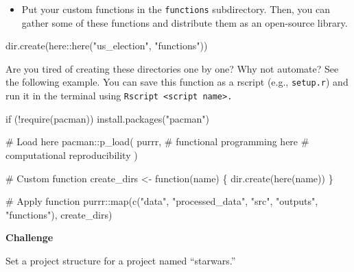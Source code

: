 \documentclass[
  letterpaper,
  DIV=11,
  numbers=noendperiod]{scrreprt}
\newenvironment{Shaded}{\begin{snugshade}}{\end{snugshade}}
\newcommand{\CommentTok}[1]{\textcolor[rgb]{0.37,0.37,0.37}{#1}}
\newcommand{\ControlFlowTok}[1]{\textcolor[rgb]{0.00,0.23,0.31}{#1}}
\newcommand{\FunctionTok}[1]{\textcolor[rgb]{0.28,0.35,0.67}{#1}}
\newcommand{\NormalTok}[1]{\textcolor[rgb]{0.00,0.23,0.31}{#1}}
\newcommand{\OtherTok}[1]{\textcolor[rgb]{0.00,0.23,0.31}{#1}}
\newcommand{\SpecialCharTok}[1]{\textcolor[rgb]{0.37,0.37,0.37}{#1}}
\newcommand{\StringTok}[1]{\textcolor[rgb]{0.13,0.47,0.30}{#1}}
\providecommand{\tightlist}{%
  \setlength{\itemsep}{0pt}\setlength{\parskip}{0pt}}\usepackage{longtable,booktabs,array}
\begin{document}
\begin{itemize}
\tightlist
\item
  Put your custom functions in the \texttt{functions} subdirectory.
  Then, you can gather some of these functions and distribute them as an
  open-source library.
\end{itemize}

\begin{Shaded}
\begin{Highlighting}[]
\FunctionTok{dir.create}\NormalTok{(here}\SpecialCharTok{::}\FunctionTok{here}\NormalTok{(}\StringTok{"us\_election"}\NormalTok{, }\StringTok{"functions"}\NormalTok{))}
\end{Highlighting}
\end{Shaded}

Are you tired of creating these directories one by one? Why not
automate? See the following example. You can save this function as a
rscript (e.g., \texttt{setup.r}) and run it in the terminal using
\texttt{Rscript\ \textless{}script\ name\textgreater{}.}

\begin{Shaded}
\begin{Highlighting}[]
\ControlFlowTok{if}\NormalTok{ (}\SpecialCharTok{!}\FunctionTok{require}\NormalTok{(pacman)) }\FunctionTok{install.packages}\NormalTok{(}\StringTok{"pacman"}\NormalTok{)}

\CommentTok{\# Load here}
\NormalTok{pacman}\SpecialCharTok{::}\FunctionTok{p\_load}\NormalTok{(}
\NormalTok{  purrr, }\CommentTok{\# functional programming}
\NormalTok{  here }\CommentTok{\# computational reproducibility}
\NormalTok{)}

\CommentTok{\# Custom function}
\NormalTok{create\_dirs }\OtherTok{\textless{}{-}} \ControlFlowTok{function}\NormalTok{(name) \{}
  \FunctionTok{dir.create}\NormalTok{(}\FunctionTok{here}\NormalTok{(name))}
\NormalTok{\}}

\CommentTok{\# Apply function }
\NormalTok{purrr}\SpecialCharTok{::}\FunctionTok{map}\NormalTok{(}\FunctionTok{c}\NormalTok{(}\StringTok{"data"}\NormalTok{, }\StringTok{"processed\_data"}\NormalTok{, }\StringTok{"src"}\NormalTok{, }\StringTok{"outputs"}\NormalTok{, }\StringTok{"functions"}\NormalTok{), create\_dirs)}
\end{Highlighting}
\end{Shaded}

\textbf{Challenge}

Set a project structure for a project named ``starwars.''
\end{document}
